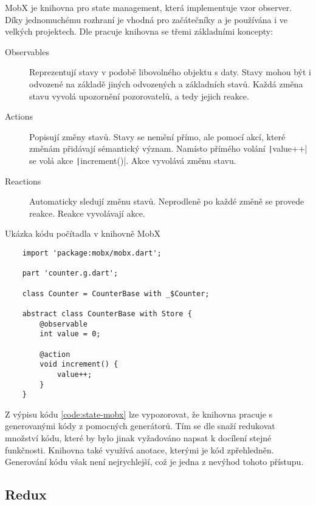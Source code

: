 MobX je knihovna pro state management,
která implementuje vzor observer.
Díky jednomuchému rozhraní je vhodná pro začátečníky
a je používána i ve velkých projektech.
Dle \cite{mobx_core_concepts} pracuje knihovna se třemi základními koncepty:

\begin{description}
    \item[Observables] Reprezentují stavy v podobě libovolného objektu s daty.
    Stavy mohou být i odvozené na základě jiných odvozených a základních stavů.
    Každá změna stavu vyvolá upozornění pozorovatelů, a tedy jejich reakce.
    \item[Actions] Popisují změny stavů.
    Stavy se nemění přímo,
    ale pomocí akcí,
    které změnám přidávají sémantický význam.
    Namísto přímého volání \texttt|value++| se volá akce
    \texttt|increment()|.
    Akce vyvolává změnu stavu.
    \item[Reactions] Automaticky sledují změnu stavů.
    Neprodleně po každé změně se provede reakce.
    Reakce vyvolávají akce.
\end{description}

\begin{listing}
    \caption{Ukázka kódu počítadla v knihovně MobX \cite{mobx_core_concepts}}
    \label{code:state-mobx}
    \begin{verbatim}
    import 'package:mobx/mobx.dart';

    part 'counter.g.dart';
    
    class Counter = CounterBase with _$Counter;
    
    abstract class CounterBase with Store {
        @observable
        int value = 0;
    
        @action
        void increment() {
            value++;
        }
    }
    \end{verbatim}
\end{listing}

Z výpisu kódu \ref{code:state-mobx} lze vypozorovat,
že knihovna pracuje s generovanými kódy z pomocných generátorů.
Tím se dle \cite{mobx_core_concepts} snaží redukovat množství kódu,
které by bylo jinak vyžadováno napsat k docílení stejné funkčnosti.
Knihovna také využívá anotace,
kterými je kód zpřehledněn.
Generování kódu však není nejrychlejší,
což je jedna z nevýhod tohoto přístupu.

\subsection{Redux}

